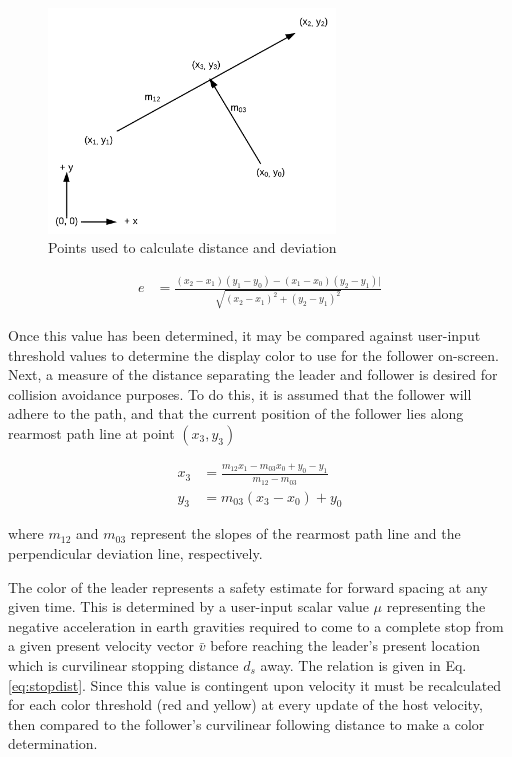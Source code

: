\documentclass[12pt]{report}
\begin{document}
\begin{figure}[ht] \centering
    \includegraphics[width=3in]{./figs/path_points.png}
    \caption{Points used to calculate distance and deviation}
    \label{fig:pathpts}
\end{figure}

\begin{align} \label{eq:laterr}
    e &= \frac{ (x_2 - x_1)(y_1 - y_0) - (x_1 - x_0)(y_2 - y_1) |} { \sqrt{ (x_2 - x_1)^2 + (y_2 - y_1)^2 } }
\end{align}

Once this value has been determined, it may be compared against user-input threshold values to determine the display color to use for the follower on-screen. Next, a measure of the distance separating the leader and follower is desired for collision avoidance purposes. To do this, it is assumed that the follower will adhere to the path, and that the current position of the follower lies along rearmost path line at point $(x_3, y_3)$

\begin{align} \label{eq:devproj}
    x_3 &= \frac{ m_{12} x_1 - m_{03} x_0 + y_0 - y_1 } { m_{12} - m_{03} } \\
    y_3 &= m_{03} (x_3 - x_0) + y_0
\end{align}

where $m_{12}$ and $m_{03}$ represent the slopes of the rearmost path line and the perpendicular deviation line, respectively.

The color of the leader represents a safety estimate for forward spacing at any given time. This is determined by a user-input scalar value $\mu$ representing the negative acceleration in earth gravities required to come to a complete stop from a given present velocity vector $\bar{v}$ before reaching the leader's present location which is curvilinear stopping distance $d_s$ away. The relation is given in Eq. \ref{eq:stopdist}. Since this value is contingent upon velocity it must be recalculated for each color threshold (red and yellow) at every update of the host velocity, then compared to the follower's curvilinear following distance to make a color determination.
\end{document}
